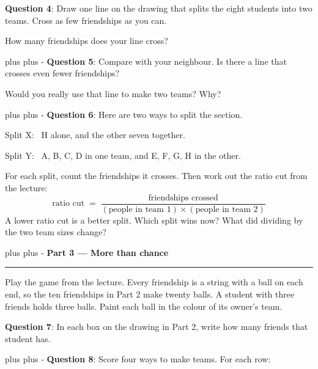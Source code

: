 \documentclass[a4paper, 14pt]{extarticle}
\newcommand{\needroom}[1]{%
  \par
  \begingroup
    \setlength{\dimen0}{#1}%
    \vskip 0pt plus \dimen0
    \penalty -100%
    \vskip 0pt plus -\dimen0
  \endgroup}
\newcommand{\parthead}[2]{%
  \needroom{6\baselineskip}%
  \partheadhere{#1}{#2}}
\newcommand{\partheadhere}[2]{%
  \vspace{0.5em}
  {\large\bfseries Part #1 --- #2}\par
  \vspace{-0.4em}\rule{\textwidth}{0.8pt}\par
  \vspace{0.1em}}
\begin{document}
\begin{center}
\end{center}

{\bf Question 4}: Draw one line on the drawing that splits the eight students
into two teams. Cross as few friendships as you can.

How many friendships does your line cross?

\needroom{3\baselineskip}%
{\bf Question 5}: Compare with your neighbour. Is there a line that crosses
even fewer friendships?

Would you really use that line to make two teams? Why?

\needroom{8\baselineskip}%
{\bf Question 6}: Here are two ways to split the section.

\quad Split X: \ H alone, and the other seven together.

\quad Split Y: \ A, B, C, D in one team, and E, F, G, H in the other.

For each split, count the friendships it crosses. Then work out the ratio cut
from the lecture:
\[
\text{ratio cut} \;=\; \frac{\text{friendships crossed}}
{(\text{people in team 1}) \times (\text{people in team 2})}
\]
A lower ratio cut is a better split. Which split wins now? What did dividing by
the two team sizes change?

\newpage
\parthead{3}{More than chance}

Play the game from the lecture. Every friendship is a string with a ball on
each end, so the ten friendships in Part 2 make twenty balls. A student with
three friends holds three balls. Paint each ball in the colour of its owner's
team.

{\bf Question 7}: In each box on the drawing in Part 2, write how many friends
that student has.

\needroom{12\baselineskip}%
{\bf Question 8}: Score four ways to make teams. For each row:
\end{document}
